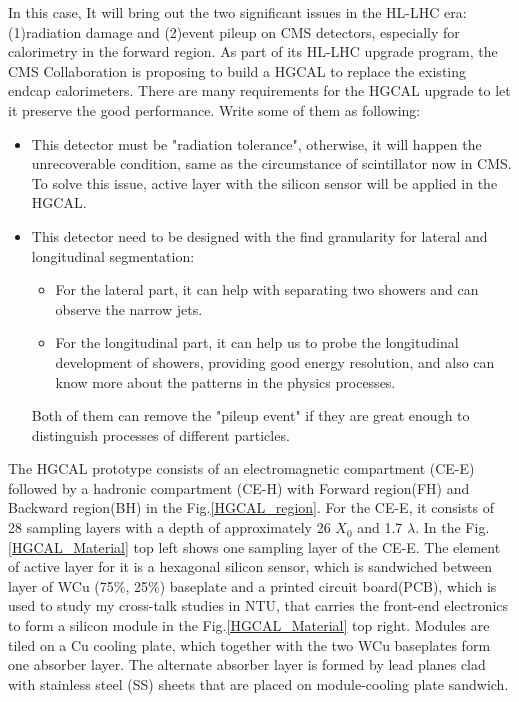 \documentclass[12pt,twoside,a4paper,an,final]{cms-tdr}
\begin{document}
In this case, It will bring out the two significant issues in the HL-LHC era: (1)radiation damage and (2)event pileup on CMS detectors, especially for calorimetry in the forward region. As part of its HL-LHC upgrade program, the CMS Collaboration is proposing to build a HGCAL to replace the existing endcap calorimeters. There are many requirements for the HGCAL upgrade to let it preserve the good performance. Write some of them as following:
\begin{itemize}
\item  This detector must be "radiation tolerance", otherwise, it will happen the unrecoverable condition, same as the circumstance of scintillator now in CMS. To solve this issue, active layer with the silicon sensor will be applied in the HGCAL.
\item  This detector need to be designed with the find granularity for lateral and longitudinal segmentation:
\begin{itemize}
\item For the lateral part, it can help with separating two showers and can observe the narrow jets. 
\item For the longitudinal part, it can help us to probe the longitudinal development of showers, providing good energy resolution, and also can know more about the patterns in the physics processes.
\end{itemize}
Both of them can remove the "pileup event" if they are great enough to distinguish processes of different particles.
\end{itemize}

The HGCAL prototype consists of an electromagnetic compartment (CE-E) followed by a hadronic compartment (CE-H) with Forward region(FH) and Backward region(BH) in the Fig.\ref{HGCAL_region}. For the CE-E, it consists of 28 sampling layers with a depth of approximately 26 $X_{0}$ and 1.7 $\lambda$. In the Fig.\ref{HGCAL_Material} top left shows one sampling layer of the CE-E. The element of active layer for it is a hexagonal silicon sensor, which is sandwiched between layer of WCu (75\%, 25\%) baseplate and a printed circuit board(PCB), which is used to study my cross-talk studies in NTU, that carries the front-end electronics to form a silicon module in the Fig.\ref{HGCAL_Material} top right. Modules are tiled on a Cu cooling plate, which together with the two WCu baseplates form one absorber layer. The alternate absorber layer is formed by lead planes clad with stainless steel (SS) sheets that are placed on module-cooling plate sandwich. 
\end{document}
